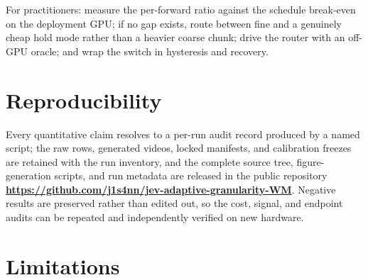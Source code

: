 \documentclass[journal]{IEEEtran}
\begin{document}
For practitioners: measure the per-forward ratio against the schedule break-even on the deployment GPU; if no gap exists, route between fine and a genuinely cheap hold mode rather than a heavier coarse chunk; drive the router with an off-GPU oracle; and wrap the switch in hysteresis and recovery.

\section{Reproducibility}
\label{sec:repro}

Every quantitative claim resolves to a per-run audit record produced by a named script; the raw rows, generated videos, locked manifests, and calibration freezes are retained with the run inventory, and the complete source tree, figure-generation scripts, and run metadata are released in the public repository \href{https://github.com/j1s4nn/jev-adaptive-granularity-WM}{\textbf{https://github.com/j1s4nn/jev-adaptive-granularity-WM}}. Negative results are preserved rather than edited out, so the cost, signal, and endpoint audits can be repeated and independently verified on new hardware.

\section{Limitations}
\label{sec:limitations}
\end{document}
